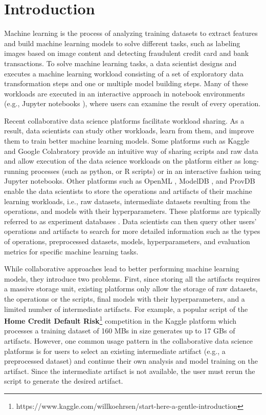 \section{Introduction} \label{sec-introduction}
Machine learning is the process of analyzing training datasets to extract features and build machine learning models to solve different tasks, such as labeling images based on image content and detecting fraudulent credit card and bank transactions.
To solve machine learning tasks, a data scientist designs and executes a machine learning workload consisting of a set of exploratory data transformation steps and one or multiple model building steps.
Many of these workloads are executed in an interactive approach in notebook environments (e.g., Jupyter notebooks \cite{Kluyver:2016aa}), where users can examine the result of every operation.

Recent collaborative data science platforms facilitate workload sharing.
As a result, data scientists can study other workloads, learn from them, and improve them to train better machine learning models.
Some platforms such as Kaggle \cite{kagglewebsite} and Google Colabratory \cite{googlecolab} provide an intuitive way of sharing scripts and raw data and allow execution of the data science workloads on the platform either as long-running processes (such as python, or R scripts) or in an interactive fashion using Jupyter notebooks.
Other platforms such as OpenML \cite{vanschoren2014openml}, ModelDB \cite{vartak2016m}, and ProvDB \cite{miao2018provdb} enable the data scientists to store the operations and artifacts of their machine learning workloads, i.e., raw datasets, intermediate datasets resulting from the operations, and models with their hyperparameters.
These platforms are typically referred to as experiment databases \cite{Vanschoren2012}.
Data scientists can then query other users' operations and artifacts to search for more detailed information such as the types of operations, preprocessed datasets, models, hyperparameters, and evaluation metrics for specific machine learning tasks.

While collaborative approaches lead to better performing machine learning models, they introduce two problems.
First, since storing all the artifacts requires a massive storage unit, existing platforms only allow the storage of raw datasets, the operations or the scripts, final models with their hyperparameters, and a limited number of intermediate artifacts.
For example, a popular script of the \textbf{Home Credit Default Risk}\footnote{https://www.kaggle.com/willkoehrsen/start-here-a-gentle-introduction} competition in the Kaggle platform which processes a training dataset of 160 MBs in size generates up to 17 GBs of artifacts.
However, one common usage pattern in the collaborative data science platforms is for users to select an existing intermediate artifact (e.g., a preprocessed dataset) and continue their own analysis and model training on the artifact. 
Since the intermediate artifact is not available, the user must rerun the script to generate the desired artifact.

